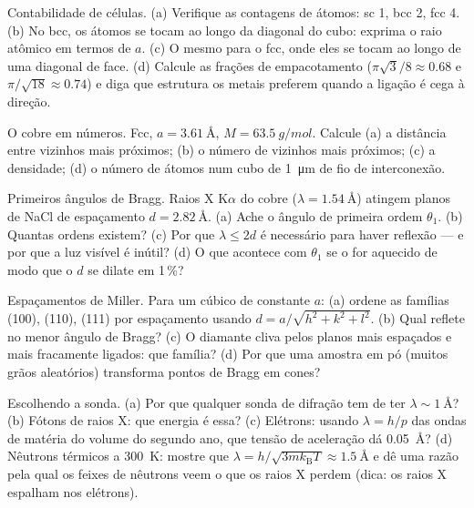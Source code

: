 \begin{exercise}[$\star$]\label{exo:b3:crystalline-solids:1}
Contabilidade de células. (a) Verifique as contagens de átomos: sc 1,
bcc 2, fcc 4. (b) No bcc, os átomos se tocam ao longo da diagonal do
cubo: exprima o raio atômico em termos de $a$. (c) O mesmo para o fcc,
onde eles se tocam ao longo de uma diagonal de face. (d) Calcule as
frações de empacotamento ($\pi\sqrt3/8 \approx 0.68$ e
$\pi/\sqrt{18} \approx 0.74$) e diga que estrutura os metais preferem
quando a ligação é cega à direção.
\end{exercise}

\begin{exercise}[$\star$]\label{exo:b3:crystalline-solids:2}
O cobre em números. Fcc, $a = \qty{3.61}{\angstrom}$, $M =
\qty{63.5}{g/mol}$. Calcule (a) a distância entre vizinhos mais próximos;
(b) o número de vizinhos mais próximos; (c) a densidade; (d) o
número de átomos num cubo de \qty{1}{\micro m} de fio de interconexão.
\end{exercise}

\begin{exercise}[$\star$]\label{exo:b3:crystalline-solids:3}
Primeiros ângulos de Bragg. Raios X K$\alpha$ do cobre
($\lambda = \qty{1.54}{\angstrom}$) atingem planos de NaCl de espaçamento
$d = \qty{2.82}{\angstrom}$. (a) Ache o ângulo de primeira ordem
$\theta_1$. (b) Quantas ordens existem? (c) Por que
$\lambda \le 2d$ é necessário para haver reflexão --- e por que a luz
visível é inútil? (d) O que acontece com $\theta_1$ se o  for
aquecido de modo que o $d$ se dilate em 1\,\%?
\end{exercise}

\begin{exercise}[$\star$]\label{exo:b3:crystalline-solids:4}
Espaçamentos de Miller. Para um  cúbico de constante $a$: (a)
ordene as famílias (100), (110), (111) por espaçamento usando
$d = a/\sqrt{h^2+k^2+l^2}$. (b) Qual reflete no menor
ângulo de Bragg? (c) O diamante cliva pelos planos mais espaçados e mais
fracamente ligados: que família? (d) Por que uma amostra em pó
(muitos grãos aleatórios) transforma pontos de Bragg em cones?
\end{exercise}

\begin{exercise}[$\star\star$]\label{exo:b3:crystalline-solids:5}
Escolhendo a sonda. (a) Por que qualquer sonda de difração tem de ter
$\lambda \sim \qty{1}{\angstrom}$? (b) Fótons de raios X: que energia
é essa? (c) Elétrons: usando $\lambda = h/p$ das ondas de matéria do
volume do segundo ano, que tensão de aceleração dá
\qty{0.05}{\angstrom}? (d) Nêutrons térmicos a \qty{300}{K}: mostre que
$\lambda = h/\sqrt{3mk_{\text{B}}T} \approx \qty{1.5}{\angstrom}$
e dê uma razão pela qual os feixes de nêutrons veem o que os raios X
perdem (dica: os raios X espalham nos elétrons).
\end{exercise}

